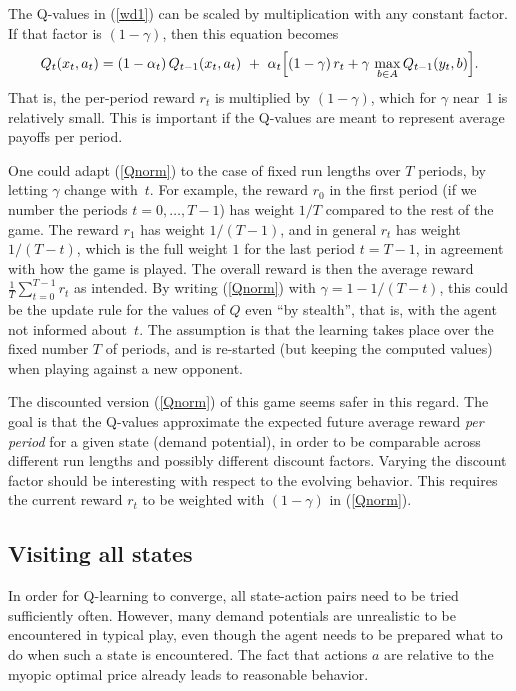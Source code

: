 \documentclass[a4paper,12pt]{article}  %
\theoremstyle{definition}
\begin{document}
The Q-values in (\ref{wd1}) can be scaled by multiplication
with any constant factor.
If that factor is $(1-\gamma)$, then this equation becomes
\begin{equation}
\label{Qnorm}
Q_t(x_t,a_t)=(1-\alpha_t)\,Q_{t-1}(x_t,a_t)~+~\alpha_t\Bigl[
(1-\gamma)\,r_t+\gamma\,\max_{b\in A}Q_{t-1}(y_t,b)\Bigr]. 
\end{equation}
That is, the per-period reward $r_t$ is multiplied by
$(1-\gamma)$, which for $\gamma$ near~1 is relatively small.
This is important if the Q-values are meant to represent
average payoffs per period.

One could adapt (\ref{Qnorm}) to the case of fixed run
lengths over $T$ periods, by letting $\gamma$ change with~$t$.
For example, the reward $r_0$ in the first period (if we
number the periods $t=0,\ldots,T-1$) has weight $1/T$
compared to the rest of the game.
The reward $r_1$ has weight $1/(T-1)$, and in general 
$r_t$ has weight $1/(T-t)$, which is the full weight $1$
for the last period $t=T-1$, in agreement with how the game
is played.
The overall reward is then the average reward
$\frac1T\sum_{t=0}^{T-1}r_t$ as intended.
By writing (\ref{Qnorm}) with $\gamma=1-1/(T-t)$, this could
be the update rule for the values of $Q$ even ``by
stealth'', that is, with the agent not informed about~$t$.
The assumption is that the learning takes place over the
fixed number $T$ of periods, and is re-started (but keeping
the computed values) when playing against a new opponent.

The discounted version (\ref{Qnorm}) of this game seems
safer in this regard.
The goal is that the Q-values approximate the expected
future average reward \textit{per period} for a given state
(demand potential), in order to be comparable across
different run lengths and possibly different discount
factors.
Varying the discount factor should be interesting with
respect to the evolving behavior.
This requires the current reward $r_t$ to be weighted with
$(1-\gamma)$ in (\ref{Qnorm}).

\subsection{Visiting all states}

In order for Q-learning to converge, all state-action pairs
need to be tried sufficiently often.
However, many demand potentials are unrealistic to be
encountered in typical play, even though the agent needs
to be prepared what to do when such a state is encountered.
The fact that actions $a$ are relative to the myopic optimal
price already leads to reasonable behavior.
\end{document}
